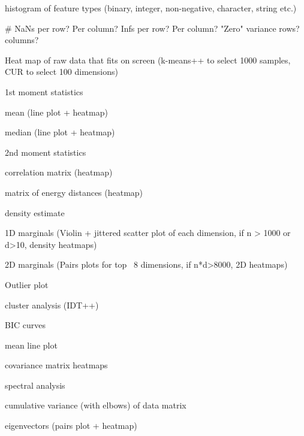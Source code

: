 \begin{compactenum}
  \item histogram of feature types (binary, integer, non-negative, character, string etc.)
  \item \# NaNs per row? Per column? Infs per row? Per column? "Zero" variance rows? columns?
  \item Heat map of raw data that fits on screen (k-means++ to select 1000 samples, CUR to select 100 dimensions)
  \item 1st moment statistics
  \begin{compactenum}
    \item mean (line plot + heatmap)
    \item median (line plot + heatmap)
  \end{compactenum}
  \item 2nd moment statistics
  \begin{compactenum}
    \item correlation matrix (heatmap)
    \item matrix of energy distances (heatmap)
  \end{compactenum}
  \item density estimate
  \begin{compactenum}
    \item 1D marginals (Violin + jittered scatter plot of each dimension,  if n > 1000 or d>10, density heatmaps)
    \item 2D marginals (Pairs plots for top ~8 dimensions, if n*d>8000, 2D heatmaps)
  \end{compactenum}
  \item Outlier plot 
  \item cluster analysis (IDT++)
  \begin{compactenum}
    \item BIC curves
    \item mean line plot
    \item covariance matrix heatmaps
  \end{compactenum}
  \item spectral analysis
  \begin{compactenum}
    \item cumulative variance (with elbows) of data matrix
    \item eigenvectors (pairs plot + heatmap)
  \end{compactenum}
\end{compactenum}


